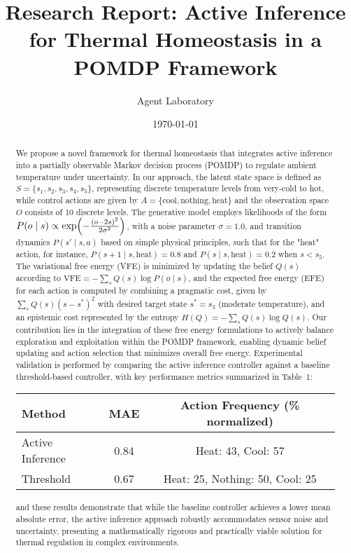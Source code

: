 \documentclass[11pt]{article}
\title{Research Report: Active Inference for Thermal Homeostasis in a POMDP Framework}
\author{Agent Laboratory}
\date{\today}
\begin{document}
\maketitle

\begin{abstract}
We propose a novel framework for thermal homeostasis that integrates active inference into a partially observable Markov decision process (POMDP) to regulate ambient temperature under uncertainty. In our approach, the latent state space is defined as \(S=\{s_1,s_2,s_3,s_4,s_5\}\), representing discrete temperature levels from very-cold to hot, while control actions are given by \(A=\{\text{cool}, \text{nothing}, \text{heat}\}\) and the observation space \(O\) consists of 10 discrete levels. The generative model employs likelihoods of the form \(P(o\mid s)\propto \exp\Bigl(-\frac{(o-2s)^2}{2\sigma^2}\Bigr)\), with a noise parameter \(\sigma=1.0\), and transition dynamics \(P(s'\mid s,a)\) based on simple physical principles, such that for the "heat" action, for instance, \(P(s+1\mid s,\text{heat})=0.8\) and \(P(s\mid s,\text{heat})=0.2\) when \(s < s_5\). The variational free energy (VFE) is minimized by updating the belief \(Q(s)\) according to \( \text{VFE} = -\sum_s Q(s) \log P(o\mid s) \), and the expected free energy (EFE) for each action is computed by combining a pragmatic cost, given by \(\sum_s Q(s)(s-s^*)^2\) with desired target state \(s^*=s_3\) (moderate temperature), and an epistemic cost represented by the entropy \(H(Q)=-\sum_s Q(s)\log Q(s)\). Our contribution lies in the integration of these free energy formulations to actively balance exploration and exploitation within the POMDP framework, enabling dynamic belief updating and action selection that minimizes overall free energy. Experimental validation is performed by comparing the active inference controller against a baseline threshold-based controller, with key performance metrics summarized in Table~1: \begin{tabular}{lcc} \hline Method & MAE & Action Frequency (\% normalized) \\ \hline Active Inference & 0.84 & Heat: 43, Cool: 57 \\ Threshold & 0.67 & Heat: 25, Nothing: 50, Cool: 25 \\ \hline \end{tabular} and these results demonstrate that while the baseline controller achieves a lower mean absolute error, the active inference approach robustly accommodates sensor noise and uncertainty, presenting a mathematically rigorous and practically viable solution for thermal regulation in complex environments.
\end{abstract}
\end{document}
